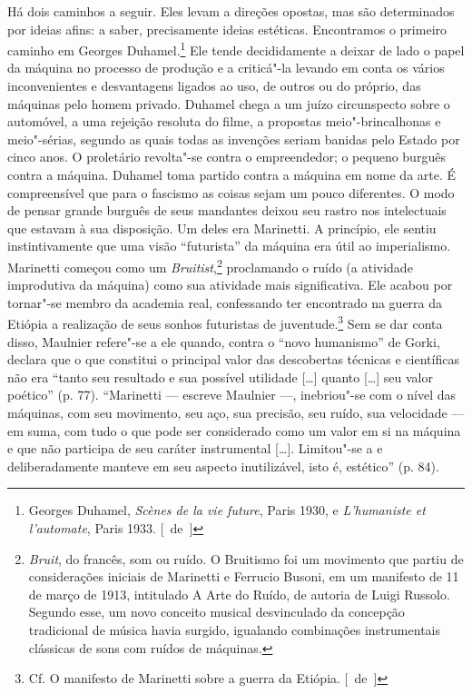 Há dois caminhos a seguir. Eles levam a direções opostas, mas são
determinados por ideias afins: a saber, precisamente ideias estéticas.
Encontramos o primeiro caminho em Georges Duhamel.\footnote{Georges
  Duhamel, \emph{Scènes de la vie future}, Paris 1930, e
  \emph{L'humaniste et l'automate}, Paris 1933. [~de~]} Ele tende
decididamente a deixar de lado o papel da máquina no processo de
produção e a criticá"-la levando em conta os vários inconvenientes e
desvantagens ligados ao uso, de outros ou do próprio, das máquinas pelo
homem privado. Duhamel chega a um juízo circunspecto sobre o automóvel,
a uma rejeição resoluta do filme, a propostas meio"-brincalhonas e
meio"-sérias, segundo as quais todas as invenções seriam banidas pelo
Estado por cinco anos. O proletário revolta"-se contra o empreendedor; o
pequeno burguês contra a máquina. Duhamel toma partido contra a máquina
em nome da arte. É compreensível que para o fascismo as coisas sejam um
pouco diferentes. O modo de pensar grande burguês de seus mandantes
deixou seu rastro nos intelectuais que estavam à sua disposição. Um
deles era Marinetti. A princípio, ele sentiu instintivamente que uma
visão ``futurista'' da máquina era útil ao imperialismo. Marinetti começou
como um \emph{Bruitist},\footnote{\emph{Bruit}, do francês, som ou
  ruído. O Bruitismo foi um movimento que partiu de considerações
  iniciais de Marinetti e Ferrucio Busoni, em um manifesto de 11 de
  março de 1913, intitulado A Arte do Ruído, de autoria de Luigi
  Russolo. Segundo esse, um novo conceito musical desvinculado da
  concepção tradicional de música havia surgido, igualando combinações
  instrumentais clássicas de sons com ruídos de máquinas. \versal{[N. E.]}} proclamando
o ruído (a atividade improdutiva da máquina) como sua atividade mais
significativa. Ele acabou por tornar"-se membro da academia real,
confessando ter encontrado na guerra da Etiópia a realização de seus
sonhos futuristas de juventude.\footnote{Cf. O manifesto de
  Marinetti sobre a guerra da Etiópia. [~de~]} Sem se dar conta disso,
Maulnier refere"-se a ele quando, contra o ``novo humanismo'' de Gorki,
declara que o que constitui o principal valor das descobertas técnicas e
científicas não era ``tanto seu resultado e sua possível utilidade
{[}\ldots{}{]} quanto {[}\ldots{}{]} seu valor poético'' (p. 77). ``Marinetti ---
escreve Maulnier ---, inebriou"-se com o nível das máquinas, com seu
movimento, seu aço, sua precisão, seu ruído, sua velocidade --- em suma,
com tudo o que pode ser considerado como um valor em si na máquina e que
não participa de seu caráter instrumental {[}\ldots{}{]}. Limitou"-se a e
deliberadamente manteve em seu aspecto inutilizável, isto é, estético''
(p. 84).

